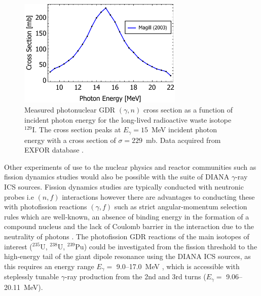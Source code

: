 \documentclass[../main.tex]{subfiles}
\begin{document}
\begin{figure}[!h]
\centering
\includegraphics[width=0.7\textwidth]{Figures/DIANA_Inverse_Compton_Source_Design/Iodine_129_cs_photon_energy.pdf}
\caption{Measured \cite{magill2003laser} photonuclear GDR $\left(\gamma,n\right)$ cross section as a function of incident photon energy for the long-lived radioactive waste isotope $^{129}\mathrm{I}$. The cross section peaks at $E_{\gamma} = 15$~\si{\mega\electronvolt} incident photon energy with a cross section of $\sigma = 229$~\si{\milli\barn}. Data acquired from EXFOR database \cite{zerkin2018experimental}.}
\label{fig:I129_cross_section_photon_energy}
\end{figure}

Other experiments of use to the nuclear physics and reactor communities such as fission dynamics studies \cite{bellia1983towards,bhike2017exploratory,finch2018monoenergetic} would also be possible with the suite of DIANA $\gamma$-ray ICS sources. Fission dynamics studies are typically conducted with neutronic probes i.e $\left(n,f\right)$ interactions however there are advantages to conducting these with photofission reactions $\left(\gamma,f\right)$ such as strict angular-momentum selection rules which are well-known, an absence of binding energy in the formation of a compound nucleus and the lack of Coulomb barrier in the interaction due to the neutrality of photons \cite{finch2018monoenergetic}. The photofission GDR reactions of the main isotopes of interest ($^{235}\mathrm{U}$, $^{238}\mathrm{U}$, $^{239}\mathrm{Pu}$) could be investigated from the fission threshold to the high-energy tail of the giant dipole resonance using the DIANA ICS sources, as this requires an energy range $E_{\gamma} =$ 9.0--17.0~\si{\mega\electronvolt} \cite{finch2018monoenergetic}, which is  accessible with steplessly tunable $\gamma$-ray production from the 2nd and 3rd turns ($E_{\gamma} =$ 9.06--20.11~\si{\mega\electronvolt}).
\end{document}
